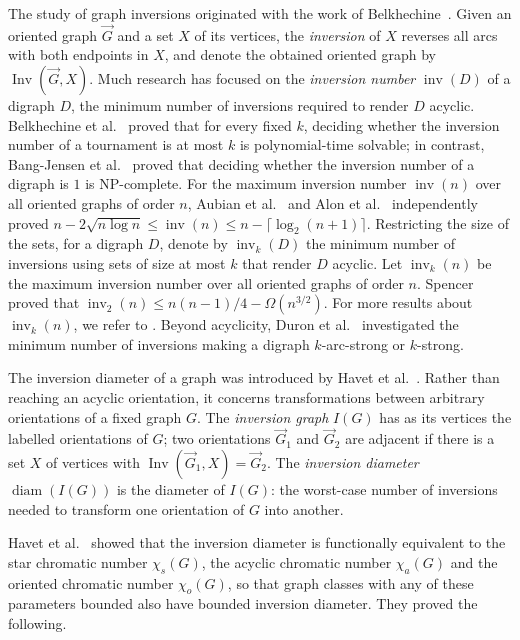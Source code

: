 \documentclass[11pt]{article}
\theoremstyle{remark}
\DeclareMathOperator{\diam}{diam}
\DeclareMathOperator{\Inv}{Inv}
\begin{document}
The study of graph inversions originated with the work of Belkhechine~\cite{belkhechine:thesis}. 
Given an oriented graph $\overrightarrow G$ and a set $X$ of its vertices, the {\it inversion} of $X$ reverses all arcs with both endpoints in $X$,    and denote the obtained oriented graph by  $\Inv(\overrightarrow G,X)$.
Much research has focused on the {\it inversion number} $\operatorname{inv}(D)$ of a digraph $D$, the minimum number of inversions required to render $D$ acyclic.
Belkhechine et al.~\cite{BBBP} proved that for every fixed $k$, deciding whether the inversion number of a tournament is at most $k$ is polynomial-time solvable; in contrast, Bang-Jensen et al.~\cite{BangJensenDaSilvaHavet} proved that deciding whether the inversion number of a digraph is $1$ is NP-complete.
For the maximum inversion number $\operatorname{inv}(n)$ over all oriented graphs of order $n$, Aubian et al.~\cite{AubianEtAl} and Alon et al.~\cite{AlonEtAl} independently proved 
 $n-2\sqrt{n\log n}\le \operatorname{inv}(n)\le n-\lceil\log_2(n+1)\rceil$. 
 Restricting the size of the sets, for a digraph $D$, denote by $\operatorname{inv}_k(D)$  the minimum number of inversions using sets of size  at most $k$
 that render $D$ acyclic. Let   $\operatorname{inv}_k(n)$ be the maximum inversion number  over all oriented graphs of order $n$.    
 Spencer~\cite{Spencer1971}  proved that $ \operatorname{inv}_2(n)\le n(n-1)/4-\Omega(n^{3/2})$. For more results about $ \operatorname{inv}_k(n)$, we refer to \cite{Chung1991,Spencer1980,Yuster2025,Vega1983}.   Beyond acyclicity,  Duron et al.~\cite{DuronEtAl} investigated the minimum number of inversions making a digraph $k$-arc-strong or $k$-strong.


The inversion diameter of a graph was introduced by Havet et al.~\cite{HavetHorschRambaud}.
Rather than reaching an acyclic orientation, it concerns transformations between arbitrary orientations of a fixed graph $G$.
The {\it inversion graph} $I(G)$ has as its vertices the labelled orientations of $G$; two orientations $\overrightarrow G_1$ and $\overrightarrow G_2$ are adjacent if there is a set $X$ of vertices with
$\Inv(\overrightarrow G_1,X)=\overrightarrow G_2$.
The {\it inversion diameter} $\diam(I(G))$ is the diameter of $I(G)$: the worst-case number of inversions needed to transform one orientation of $G$ into another.

Havet et al.~\cite{HavetHorschRambaud} showed that the inversion diameter is functionally equivalent to the star chromatic number $\chi_s(G)$, the acyclic chromatic number $\chi_a(G)$ and the oriented chromatic number $\chi_o(G)$, so that graph classes with any of these parameters bounded also have bounded inversion diameter.
They proved the following.
\end{document}
